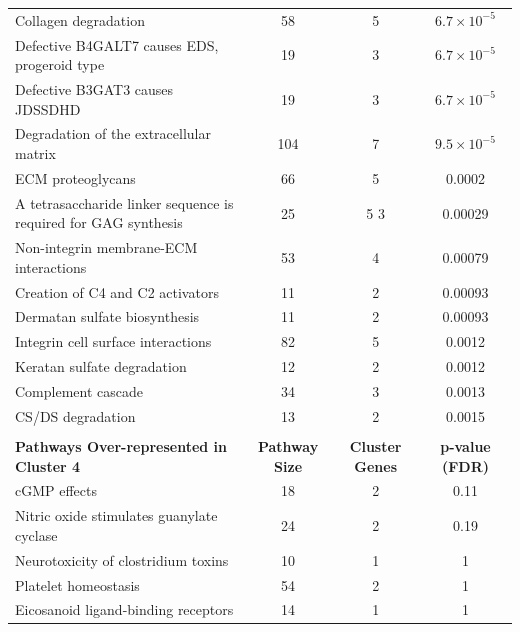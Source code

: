 \begin{table}[!hp]
{\begin{tabular}{lccc}
  \rowcolor{Cluster_Orange!15}
  Collagen degradation &  58 &   5 & $6.7 \times 10^{-5}$ \\ 
  \rowcolor{Cluster_Orange!20}
  Defective B4GALT7 causes EDS, progeroid type &  19 &   3 & $6.7 \times 10^{-5}$ \\ 
  \rowcolor{Cluster_Orange!15}
  Defective B3GAT3 causes JDSSDHD &  19 &   3 & $6.7 \times 10^{-5}$ \\ 
  \rowcolor{Cluster_Orange!20}
  Degradation of the extracellular matrix & 104 &   7 & $9.5 \times 10^{-5}$ \\ 
  \rowcolor{Cluster_Orange!15}
  ECM proteoglycans &  66 &   5 & 0.0002 \\ 
  \rowcolor{Cluster_Orange!20}
  A tetrasaccharide linker sequence is required for GAG synthesis &  25 & 5 3 & 0.00029 \\ 
  \rowcolor{Cluster_Orange!15}
  Non-integrin membrane-ECM interactions &  53 &   4 & 0.00079 \\ 
  \rowcolor{Cluster_Orange!20}
  Creation of C4 and C2 activators &  11 &   2 & 0.00093 \\ 
  \rowcolor{Cluster_Orange!15}
  Dermatan sulfate biosynthesis &  11 &   2 & 0.00093 \\ 
  \rowcolor{Cluster_Orange!20}
  Integrin cell surface interactions &  82 &   5 & 0.0012 \\ 
  \rowcolor{Cluster_Orange!15}
  Keratan sulfate degradation &  12 &   2 & 0.0012 \\ 
  \rowcolor{Cluster_Orange!20}
  Complement cascade &  34 &   3 & 0.0013 \\ 
  \rowcolor{Cluster_Orange!15}
  CS/DS degradation &  13 &   2 & 0.0015 \\ 
  \hline
  \\ 
  \cellcolor{white} \large{\textbf{Pathways Over-represented in Cluster 4}} & \large{\textbf{Pathway Size}} & \large{\textbf{Cluster Genes}} & \large{\textbf{p-value (FDR)}} \\ %
  \hline
  \rowcolor{Cluster_Red!20}
  cGMP effects &  18 &   2 & 0.11 \\ 
  \rowcolor{Cluster_Red!15}
  Nitric oxide stimulates guanylate cyclase &  24 &   2 & 0.19 \\ 
  \rowcolor{Cluster_Red!20}
  Neurotoxicity of clostridium toxins &  10 &   1 &   1 \\ 
  \rowcolor{Cluster_Red!15}
  Platelet homeostasis &  54 &   2 &   1 \\ 
  \rowcolor{Cluster_Red!20}
  Eicosanoid ligand-binding receptors &  14 &   1 &   1 \\ 

\end{tabular}}
\end{table}
